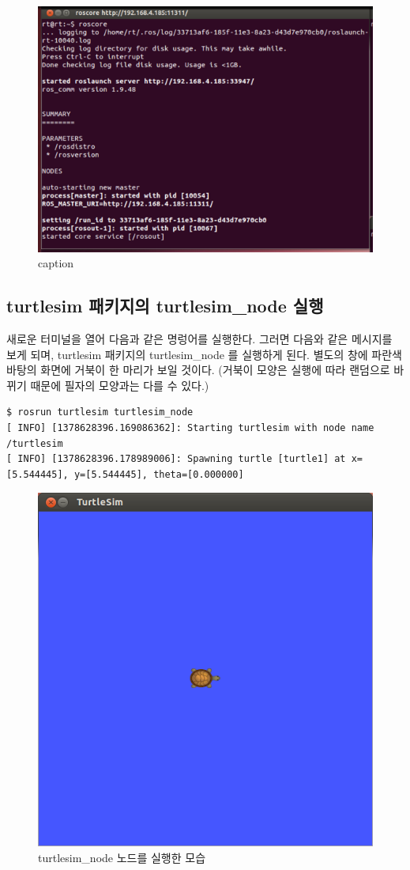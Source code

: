 \begin{figure}[h]
\centering\includegraphics[width=0.7\columnwidth]{pictures/chapter2/roscore.png}
\caption{caption}
\end{figure}

\subsection{turtlesim 패키지의 turtlesim\_node 실행}
새로운 터미널을 열어 다음과 같은 명렁어를 실행한다. 그러면 다음와 같은 메시지를 보게 되며, turtlesim 패키지의 turtlesim\_node 를 실행하게 된다. 별도의 창에 파란색 바탕의 화면에 거북이 한 마리가 보일 것이다. (거북이 모양은 실행에 따라 랜덤으로 바뀌기 때문에 필자의 모양과는 다를 수 있다.)
\\
\begin{lstlisting}[language=ROS]
$ rosrun turtlesim turtlesim_node
[ INFO] [1378628396.169086362]: Starting turtlesim with node name /turtlesim
[ INFO] [1378628396.178989006]: Spawning turtle [turtle1] at x=[5.544445], y=[5.544445], theta=[0.000000]
\end{lstlisting}

\begin{figure}[h]
\centering\includegraphics[width=0.5\columnwidth]{pictures/chapter2/turtlesim_node.png}
\caption{turtlesim\_node 노드를 실행한 모습}
\end{figure}

